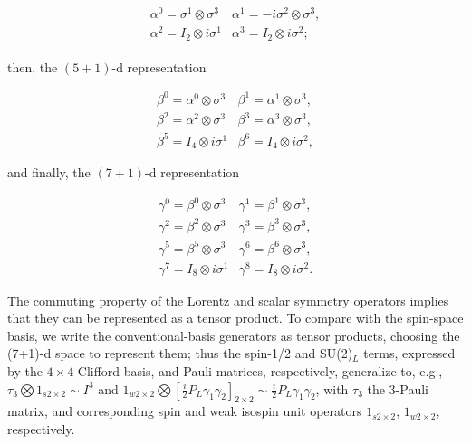 \documentclass[12pt]{article}
\renewcommand\[{\begin{dmath}}
\renewcommand\]{\end{dmath}}
\begin{document}
\begin{eqnarray}
\begin{array}{cl}
\alpha^{0}=\sigma^{1}\otimes\sigma^{3} & \alpha^{1}=-i\sigma^{2}\otimes\sigma^{3},\\
\alpha^{2}=I_{2}\otimes i\sigma^{1} & \alpha^{3}=I_{2}\otimes i\sigma^{2};
\end{array}\label{eq:A1}
\end{eqnarray}

\noindent then, the $(5+1)$-d  representation

\begin{equation}
\begin{array}{ll}
\beta^{0}=\alpha^{0}\otimes\sigma^{3} & \beta^{1}=\alpha^{1}\otimes\sigma^{3},\\
\beta^{2}=\alpha^{2}\otimes\sigma^{3} & \beta^{3}=\alpha^{3}\otimes\sigma^{3},\\
\beta^{5}=I_{4}\otimes i\sigma^{1} & \beta^{6}=I_{4}\otimes i\sigma^{2},
\end{array}\label{eq:A2}
\end{equation}

\noindent and finally, the $(7+1)$-d representation

\begin{equation}
\begin{array}{ll}
\gamma^{0}=\beta^{0}\otimes\sigma^{3} & \gamma^{1}=\beta^{1}\otimes\sigma^{3},\\
\gamma^{2}=\beta^{2}\otimes\sigma^{3} & \gamma^{3}=\beta^{3}\otimes\sigma^{3},\\
\gamma^{5}=\beta^{5}\otimes\sigma^{3} & \gamma^{6}=\beta^{6}\otimes\sigma^{3},\\
\gamma^{7}=I_{8}\otimes i\sigma^{1} & \gamma^{8}=I_{8}\otimes i\sigma^{2}.
\end{array}\label{eq:A3}
\end{equation}


  The commuting property of the Lorentz and scalar symmetry operators implies that they can be represented as a tensor product.   To compare with the spin-space basis,
    we write    the conventional-basis generators  as  tensor products,   choosing the (7+1)-d space to represent them;  thus
  the  spin-1/2   and SU(2)$_L$ terms,  expressed by the $4\times4$  Clifford  basis, and Pauli matrices, respectively,  generalize to, e.g.,   $ \tau_3\bigotimes 1_{s 2\times2}\sim I^3 $
  and  $1_{w 2\times2}\bigotimes [  \frac{i}{2}P_L \gamma_1\gamma_2]_{2\times 2}   \sim  \frac{i}{2}P_L \gamma_1\gamma_2 $, with $\tau_3$  the 3-Pauli matrix, and corresponding
  spin and weak isospin unit operators  $1_{s 2\times2}$, $1_{w 2\times2}$, respectively.
\end{document}
